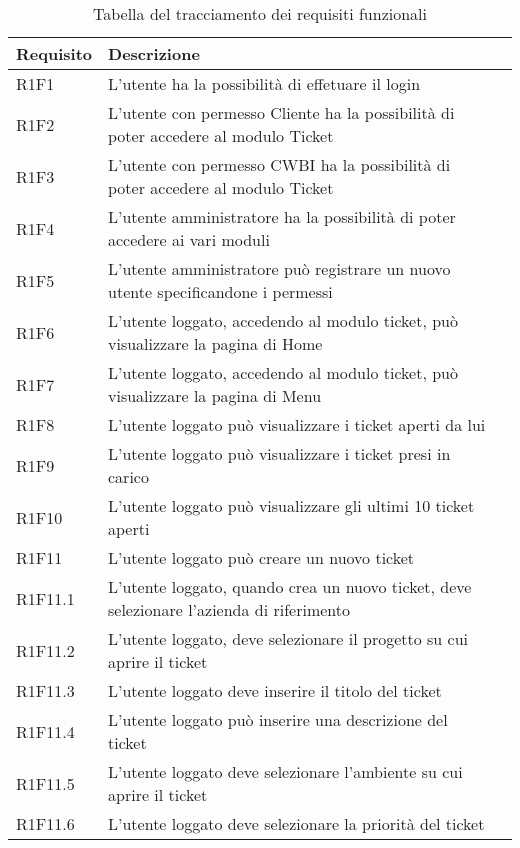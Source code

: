 \begin{table}[!h]

{\renewcommand{\arraystretch}{2}
\label{tab:requisiti-funzionali}
\begin{tabularx}{\textwidth}{PXl}
\hline\hline
\textbf{Requisito} & \textbf{Descrizione}\\
\hline

R1F1 & L'utente ha la possibilità di effetuare il login\\
\hline
R1F2 & L'utente con permesso Cliente ha la possibilità di poter accedere al modulo Ticket\\
\hline
R1F3 & L'utente con permesso CWBI ha la possibilità di poter accedere al modulo Ticket\\
\hline
R1F4	 & L'utente amministratore ha la possibilità di poter accedere ai vari moduli\\
\hline
R1F5 & L'utente amministratore può registrare un nuovo utente specificandone i permessi\\
\hline
R1F6 & L'utente loggato, accedendo al modulo ticket, può visualizzare la pagina di Home\\
\hline
R1F7 & L'utente loggato, accedendo al modulo ticket, può visualizzare la pagina di Menu\\
\hline
R1F8 & L'utente loggato può visualizzare i ticket aperti da lui\\
\hline
R1F9 & L'utente loggato può visualizzare i ticket presi in carico\\
\hline
R1F10 & L'utente loggato può visualizzare gli ultimi 10 ticket aperti\\
\hline

R1F11 & L'utente loggato può creare un nuovo ticket\\
\hline
R1F11.1 & L'utente loggato, quando crea un nuovo ticket, deve selezionare l'azienda di riferimento\\
\hline
R1F11.2 & L'utente loggato, deve selezionare il progetto su cui aprire il ticket\\
\hline
R1F11.3 & L'utente loggato deve inserire il titolo del ticket\\
\hline
R1F11.4 & L'utente loggato può inserire una descrizione del ticket\\
\hline
R1F11.5 & L'utente loggato deve selezionare l'ambiente su cui aprire il ticket\\
\hline
R1F11.6 & L'utente loggato deve selezionare la priorità del ticket\\
\hline

\end{tabularx}
}
\caption{Tabella del tracciamento dei requisiti funzionali}
\end{table}

